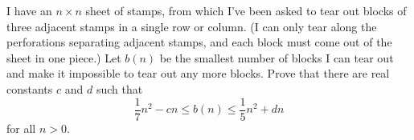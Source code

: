 I have an $n \times n$ sheet of stamps, from which I've been asked to tear out blocks of three adjacent stamps in a single row or column. (I can only tear along the perforations separating adjacent stamps, and each block must come out of the sheet in one piece.) Let $b(n)$ be the smallest number of blocks I can tear out and make it impossible to tear out any more blocks. Prove that there are real constants $c$ and $d$ such that \[ \dfrac{1}{7} n^2 - cn \leq b(n) \leq \dfrac{1}{5} n^2 + dn  \] for all $n > 0$.
